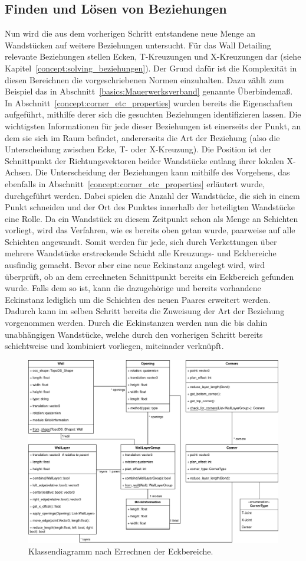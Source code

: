 \subsection{Finden und Lösen von Beziehungen}
Nun wird die aus dem vorherigen Schritt entstandene neue Menge an Wandstücken auf weitere Beziehungen untersucht.
Für das Wall Detailing relevante Beziehungen stellen Ecken, T-Kreuzungen und X-Kreuzungen dar (siehe Kapitel~\ref{concept:solving_beziehungen}).
Der Grund dafür ist die Komplexität in diesen Bereichnen die vorgeschriebenen Normen einzuhalten.
Dazu zählt zum Beispiel das in Abschnitt~\ref{basics:Mauerwerksverband} genannte Überbindemaß.
In Abschnitt~\ref{concept:corner_etc_properties} wurden bereits die Eigenschaften aufgeführt, mithilfe derer sich die gesuchten Beziehungen identifizieren lassen.
Die wichtigsten Informationen für jede dieser Beziehungen ist einerseits der Punkt, an dem sie sich im Raum befindet, andererseits die Art der Beziehung (also die Unterscheidung zwischen Ecke, T- oder X-Kreuzung).
Die Position ist der Schnittpunkt der Richtungsvektoren beider Wandstücke entlang ihrer lokalen X-Achsen.
Die Unterscheidung der Beziehungen kann mithilfe des Vorgehens, das ebenfalls in Abschnitt~\ref{concept:corner_etc_properties} erläutert wurde, durchgeführt werden.
Dabei spielen die Anzahl der Wandstücke, die sich in einem Punkt schneiden und der Ort des Punktes innerhalb der beteiligten Wandstücke eine Rolle.
Da ein Wandstück zu diesem Zeitpunkt schon als Menge an Schichten vorliegt, wird das Verfahren, wie es bereits oben getan wurde, paarweise auf alle Schichten angewandt.
Somit werden für jede, sich durch Verkettungen über mehrere Wandstücke erstreckende Schicht alle Kreuzungs- und Eckbereiche ausfindig gemacht.
Bevor aber eine neue Eckinstanz angelegt wird, wird überprüft, ob an dem errechneten Schnittpunkt bereits ein Eckbereich gefunden wurde.
Falls dem so ist, kann die dazugehörige und bereits vorhandene Eckinstanz lediglich um die Schichten des neuen Paares erweitert werden.
Dadurch kann im selben Schritt bereits die Zuweisung der Art der Beziehung vorgenommen werden.
Durch die Eckinstanzen werden nun die bis dahin unabhängigen Wandstücke, welche durch den vorherigen Schritt bereits schichtweise und kombiniert vorliegen, miteinader verknüpft.
\begin{figure}[hb]
  \centering
  \includegraphics[width=0.8\columnwidth]{fig/klassendiagramm_corners.drawio.png}
  \caption{Klassendiagramm nach Errechnen der Eckbereiche.}
  \label{fig:real:class_diagram_corners}
\end{figure}
